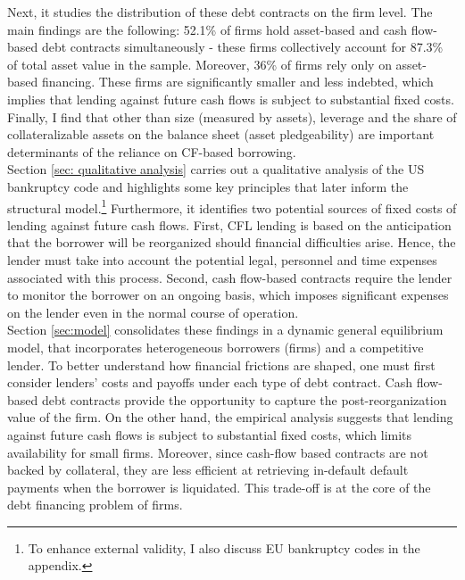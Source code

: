 \documentclass[12pt]{article}
\begin{document}
Next, it studies the distribution of these debt contracts on the firm level. The main findings are the following: 52.1\% of firms hold asset-based and cash flow-based debt contracts simultaneously - these firms collectively account for 87.3\% of total asset value in the sample. Moreover, 36\% of firms rely only on asset-based financing. These firms are significantly smaller and less indebted, which implies that lending against future cash flows is subject to substantial fixed costs. Finally, I find that other than size (measured by assets), leverage and the share of collateralizable assets on the balance sheet (asset pledgeability) are important determinants of the reliance on CF-based borrowing. \vspace{3mm} \\
Section \ref{sec: qualitative analysis} carries out a qualitative analysis of the US bankruptcy code and highlights some key principles that later inform the structural model.\footnote{To enhance external validity, I also discuss EU bankruptcy codes in the appendix.} Furthermore, it identifies two potential sources of fixed costs of lending against future cash flows. First, CFL lending is based on the anticipation that the borrower will be reorganized should financial difficulties arise. Hence, the lender must take into account the potential legal, personnel and time expenses associated with this process. Second, cash flow-based contracts require the lender to monitor the borrower on an ongoing basis, which imposes significant expenses on the lender even in the normal course of operation. \vspace{3mm} \\
Section \ref{sec:model} consolidates these findings in a dynamic general equilibrium model, that incorporates heterogeneous borrowers (firms) and a competitive lender. To better understand how financial frictions are shaped, one must first consider lenders' costs and payoffs under each type of debt contract. Cash flow-based debt contracts provide the opportunity to capture the post-reorganization value of the firm. On the other hand, the empirical analysis suggests that lending against future cash flows is subject to substantial fixed costs, which limits availability for small firms. Moreover, since cash-flow based contracts are not backed by collateral, they are less efficient at retrieving in-default default payments when the borrower is liquidated. This trade-off is at the core of the debt financing problem of firms. \vspace{3mm} \\ 
\end{document}
